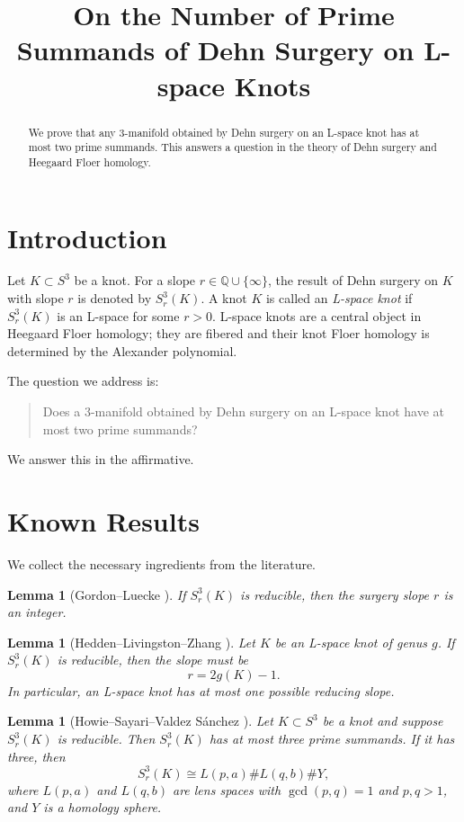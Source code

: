 \documentclass[11pt]{article}
\title{On the Number of Prime Summands of Dehn Surgery on L-space Knots}
\author{}
\date{}
\newtheorem{lemma}[theorem]{Lemma}
\begin{document}
\maketitle

\begin{abstract}
We prove that any 3-manifold obtained by Dehn surgery on an L-space knot has at most two prime summands. This answers a question in the theory of Dehn surgery and Heegaard Floer homology.
\end{abstract}

\section{Introduction}

Let \(K \subset S^3\) be a knot. For a slope \(r \in \mathbb{Q} \cup \{\infty\}\), the result of Dehn surgery on \(K\) with slope \(r\) is denoted by \(S^3_r(K)\). A knot \(K\) is called an \emph{L-space knot} if \(S^3_r(K)\) is an L-space for some \(r > 0\). L-space knots are a central object in Heegaard Floer homology; they are fibered and their knot Floer homology is determined by the Alexander polynomial.

The question we address is: 
\begin{quote}
Does a 3-manifold obtained by Dehn surgery on an L-space knot have at most two prime summands?
\end{quote}
We answer this in the affirmative.

\section{Known Results}

We collect the necessary ingredients from the literature.

\begin{lemma}[Gordon--Luecke \cite{GordonLuecke1, GordonLuecke2}]
\label{lemma:GL}
If \(S^3_r(K)\) is reducible, then the surgery slope \(r\) is an integer.
\end{lemma}

\begin{lemma}[Hedden--Livingston--Zhang \cite{HLZ15}]
\label{lemma:HLZ}
Let \(K\) be an L-space knot of genus \(g\). If \(S^3_r(K)\) is reducible, then the slope must be
\[
r = 2g(K) - 1.
\]
In particular, an L-space knot has at most one possible reducing slope.
\end{lemma}

\begin{lemma}[Howie--Sayari--Valdez S\'anchez \cite{Howie, Sayari, Valdez}]
\label{lemma:HSV}
Let \(K \subset S^3\) be a knot and suppose \(S^3_r(K)\) is reducible. Then \(S^3_r(K)\) has at most three prime summands. If it has three, then
\[
S^3_r(K) \cong L(p,a) \# L(q,b) \# Y,
\]
where \(L(p,a)\) and \(L(q,b)\) are lens spaces with \(\gcd(p,q)=1\) and \(p,q>1\), and \(Y\) is a homology sphere.
\end{lemma}
\end{document}
